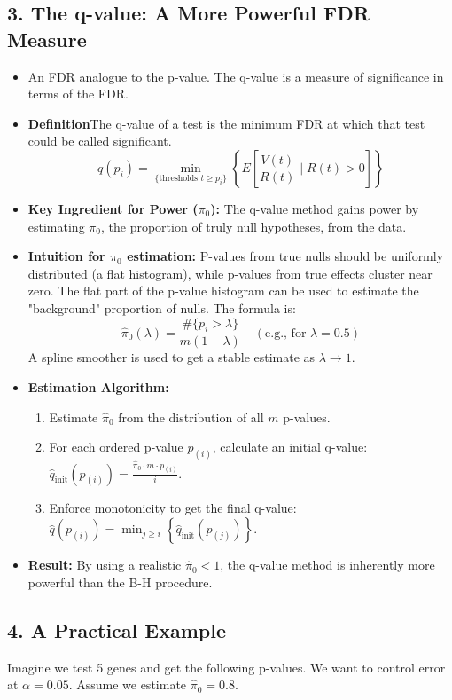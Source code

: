 \documentclass{article}
\newcommand{\piO}{\pi_0}
\newcommand{\hatpiO}{\hat{\pi}_0}
\begin{document}
\subsection*{3. The q-value: A More Powerful FDR Measure}
\begin{itemize}
    \item An FDR analogue to the p-value. The q-value is a measure of significance in terms of the FDR.
    \item \textbf{Definition}The q-value of a test is the minimum FDR at which that test could be called significant.
    $$ q(p_i) = \min_{\{\text{thresholds } t \ge p_i\}} \left\{ E\left[ \frac{V(t)}{R(t)} \mid R(t)>0 \right] \right\} $$
    \item \textbf{Key Ingredient for Power ($\piO$):} The q-value method gains power by estimating $\piO$, the proportion of truly null hypotheses, from the data.
    \item \textbf{Intuition for $\piO$ estimation:} P-values from true nulls should be uniformly distributed (a flat histogram), while p-values from true effects cluster near zero. The flat part of the p-value histogram can be used to estimate the "background" proportion of nulls. The formula is:
    $$ \hatpiO(\lambda) = \frac{\#\{p_i > \lambda\}}{m(1-\lambda)} \quad (\text{e.g., for } \lambda=0.5) $$
    A spline smoother is used to get a stable estimate as $\lambda \to 1$.
    \item \textbf{Estimation Algorithm:}
        \begin{enumerate}
            \item Estimate $\hatpiO$ from the distribution of all $m$ p-values.
            \item For each ordered p-value $p_{(i)}$, calculate an initial q-value: $\hat{q}_{\text{init}}(p_{(i)}) = \frac{\hatpiO \cdot m \cdot p_{(i)}}{i}$.
            \item Enforce monotonicity to get the final q-value: $\hat{q}(p_{(i)}) = \min_{j \ge i} \left\{\hat{q}_{\text{init}}(p_{(j)})\right\}$.
        \end{enumerate}
    \item \textbf{Result:} By using a realistic $\hatpiO < 1$, the q-value method is inherently more powerful than the B-H procedure.
\end{itemize}

\subsection*{4. A Practical Example}
Imagine we test 5 genes and get the following p-values. We want to control error at $\alpha=0.05$. Assume we estimate $\hatpiO=0.8$.
\end{document}
